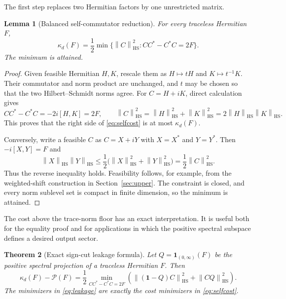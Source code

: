 \documentclass[11pt]{article}
\newtheorem{theorem}{Theorem}[section]
\newtheorem{lemma}[theorem]{Lemma}
\theoremstyle{definition}
\theoremstyle{remark}
\newcommand{\1}{\mathbf 1}
\newcommand{\norm}[1]{\left\lVert #1\right\rVert}
\newcommand{\HS}{\mathrm{HS}}
\newcommand{\PP}{\mathcal P}
\begin{document}
The first step replaces two Hermitian factors by one unrestricted matrix.

\begin{lemma}[Balanced self-commutator reduction]
\label{lem:balance}
For every traceless Hermitian $F$,
\begin{equation}
 \kappa_d(F)=\frac12\min\{\norm C_{\HS}^2:CC^*-C^*C=2F\}.
 \label{eq:selfcost}
\end{equation}
The minimum is attained.
\end{lemma}

\begin{proof}
Given feasible Hermitian $H,K$, rescale them as $H\mapsto tH$ and $K\mapsto t^{-1}K$.  Their commutator and norm product are unchanged, and $t$ may be chosen so that the two Hilbert--Schmidt norms agree.  For $C=H+iK$, direct calculation gives
\[
 CC^*-C^*C=-2i[H,K]=2F,
 \qquad \norm C_{\HS}^2=\norm H_{\HS}^2+\norm K_{\HS}^2
 =2\norm H_{\HS}\norm K_{\HS}.
\]
This proves that the right side of \eqref{eq:selfcost} is at most $\kappa_d(F)$.

Conversely, write a feasible $C$ as $C=X+iY$ with $X=X^*$ and $Y=Y^*$.  Then $-i[X,Y]=F$ and
\[
 \norm X_{\HS}\norm Y_{\HS}
 \le\frac12\bigl(\norm X_{\HS}^2+\norm Y_{\HS}^2\bigr)
 =\frac12\norm C_{\HS}^2.
\]
Thus the reverse inequality holds.  Feasibility follows, for example, from the weighted-shift construction in Section~\ref{sec:upper}.  The constraint is closed, and every norm sublevel set is compact in finite dimension, so the minimum is attained.
\end{proof}

The cost above the trace-norm floor has an exact interpretation.  It is useful both for the equality proof and for applications in which the positive spectral subspace defines a desired output sector.

\begin{theorem}[Exact sign-cut leakage formula]
\label{thm:leakage}
Let $Q=\1_{(0,\infty)}(F)$ be the positive spectral projection of a traceless Hermitian $F$.  Then
\begin{equation}
 \boxed{\quad
 \kappa_d(F)-\PP(F)=\frac12
 \min_{CC^*-C^*C=2F}
 \left(\norm{(\1-Q)C}_{\HS}^2+\norm{CQ}_{\HS}^2\right).
 \quad}
 \label{eq:leakage}
\end{equation}
The minimizers in \eqref{eq:leakage} are exactly the cost minimizers in \eqref{eq:selfcost}.
\end{theorem}
\end{document}
